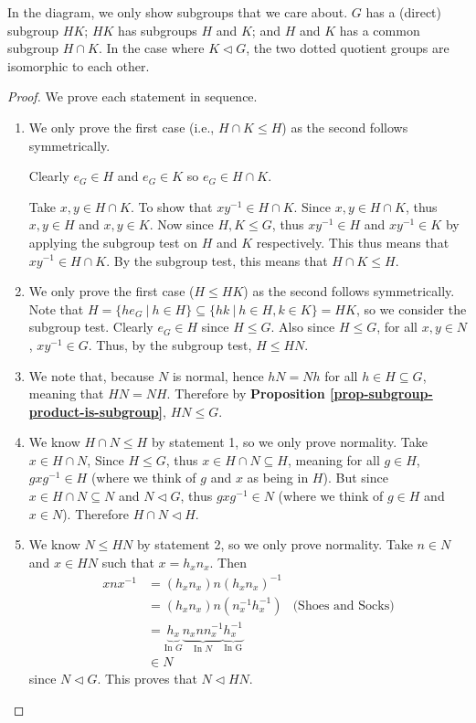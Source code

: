 In the diagram, we only show subgroups that we care about. $G$ has a (direct) subgroup $HK$; $HK$ has subgroups $H$ and $K$; and $H$ and $K$ has a common subgroup $H\cap K$. In the case where $K \lhd G$, the two dotted quotient groups are isomorphic to each other.

\begin{proof}
    We prove each statement in sequence.

    \begin{enumerate}
        \item We only prove the first case (i.e., $H \cap K \leq H$) as the second follows symmetrically.
        
        Clearly $e_G \in H$ and $e_G \in K$ so $e_G \in H \cap K$.
        
        Take $x, y \in H \cap K$. To show that $xy^{-1} \in H \cap K$. Since $x, y \in H \cap K$, thus $x, y \in H$ and $x, y \in K$. Now since $H, K \leq G$, thus $xy^{-1} \in H$ and $xy^{-1} \in K$ by applying the subgroup test on $H$ and $K$ respectively. This thus means that $xy^{-1} \in H \cap K$. By the subgroup test, this means that $H \cap K \leq H$.
        
        \item We only prove the first case ($H \leq HK$) as the second follows symmetrically. Note that $H = \{he_G \ | \ h \in H\} \subseteq \{hk \ | \ h \in H, k \in K\} = HK$, so we consider the subgroup test. Clearly $e_G \in H$ since $H \leq G$. Also since $H \leq G$, for all $x, y \in N$, $xy^{-1} \in G$. Thus, by the subgroup test, $H \leq HN$.
        
        \item We note that, because $N$ is normal, hence $hN = Nh$ for all $h \in H \subseteq G$, meaning that $HN = NH$. Therefore by \textbf{Proposition \ref{prop-subgroup-product-is-subgroup}}, $HN \leq G$.

        \item We know $H \cap N \leq H$ by statement 1, so we only prove normality. Take $x \in H \cap N$, Since $H \leq G$, thus $x \in H \cap N \subseteq H$, meaning for all $g \in H$, $gxg^{-1} \in H$ (where we think of $g$ and $x$ as being in $H$). But since $x \in H \cap N \subseteq N$ and $N \lhd G$, thus $gxg^{-1} \in N$ (where we think of $g \in H$ and $x \in N$). Therefore $H \cap N \lhd H$.

        \item We know $N \leq HN$ by statement 2, so we only prove normality. Take $n \in N$ and $x \in HN$ such that $x = h_xn_x$. Then
        \begin{align*}
            xnx^{-1} &= (h_xn_x)n(h_xn_x)^{-1}\\
            &= (h_xn_x)n(n_x^{-1}h_x^{-1}) & \text{(Shoes and Socks)}\\
            &= \underbrace{h_x}_{\text{In }G}\underbrace{n_xnn_x^{-1}}_{\text{In }N}\underbrace{h_x^{-1}}_{\text{In G}}\\
            &\in N
        \end{align*}
        since $N \lhd G$. This proves that $N \lhd HN$.


\end{enumerate}
\end{proof}

